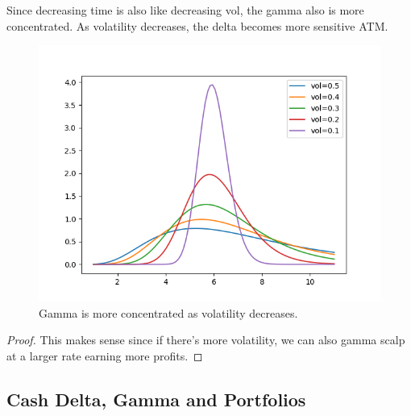 \documentclass{article}
\begin{document}
    \begin{theorem}
      Since decreasing time is also like decreasing vol, the gamma also is more concentrated. As volatility decreases, the delta becomes more sensitive ATM. 
      \begin{figure}[H]
        \centering 
        \includegraphics[scale=0.45]{img/gamma_wrt_vol.png}
        \caption{Gamma is more concentrated as volatility decreases.} 
        \label{fig:gamma_wrt_vol}
      \end{figure}
    \end{theorem}
    \begin{proof}
      This makes sense since if there's more volatility, we can also gamma scalp at a larger rate earning more profits. 
    \end{proof}

  \subsection{Cash Delta, Gamma and Portfolios}
\end{document}
